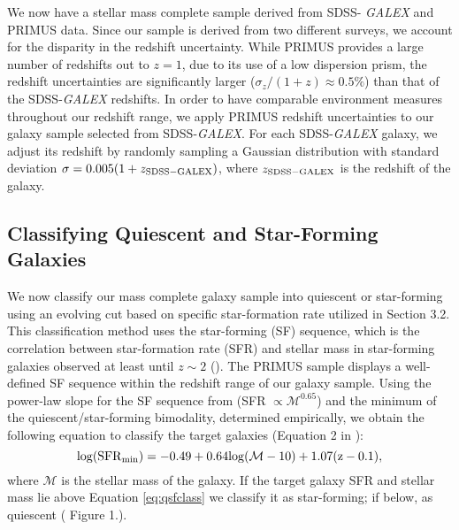 \documentclass{emulateapj}
\begin{document}
We now have a stellar mass complete sample derived from SDSS-{\em
  GALEX} and PRIMUS data. Since our sample is derived from two
different surveys, we account for the disparity in the redshift
uncertainty. While PRIMUS provides a large number of redshifts out to
$z = 1$, due to its use of a low dispersion prism, the redshift
uncertainties are significantly larger ($\sigma_{z}/(1+z) \approx 0.5
\%$) than that of the SDSS-{\em GALEX} redshifts. In order to have
comparable environment measures throughout our redshift range, we
apply PRIMUS redshift uncertainties to our galaxy sample selected from
SDSS-{\em GALEX}. For each SDSS-{\em GALEX} galaxy, we adjust its
redshift by randomly sampling a Gaussian distribution with standard
deviation $\sigma = 0.005 (1+z_{\rm{SDSS}-GALEX})$, where
$z_{\rm{SDSS}-GALEX}$ is the redshift of the galaxy.

\subsection{Classifying Quiescent and Star-Forming Galaxies} \label{sec:sfq}
We now classify our mass complete galaxy sample into quiescent or star-forming using an evolving cut based on specific star-formation rate utilized in \cite{Moustakas:2013aa} Section 3.2. This classification method uses the star-forming (SF) sequence, which is the correlation between star-formation rate (SFR) and stellar mass in star-forming galaxies observed at least until $z \sim 2$ (\citealt{Noeske:2007aa, Karim:2011aa}). The PRIMUS sample displays a well-defined SF sequence within the redshift range of our galaxy sample. Using the power-law slope for the SF sequence from \cite{Salim:2007aa} (SFR $\propto \mathcal{M}^{0.65}$) and the minimum of the quiescent/star-forming bimodality, determined empirically, we obtain the following equation to classify the target galaxies (Equation 2 in \citealt{Moustakas:2013aa}):
\begin{equation}
\rm{log}(\rm{SFR}_{\rm{min}}) = -0.49 + 0.64 \rm{log}(\mathcal{M} - 10) +1.07(z-0.1), 
\end{equation} \label{eq:qsfclass} 
where $\mathcal{M}$ is the stellar mass of the galaxy. If the target galaxy SFR and stellar mass lie above Equation \ref{eq:qsfclass} we classify it as star-forming; if below, as quiescent (\citealt{Moustakas:2013aa} Figure 1.).
\end{document}
